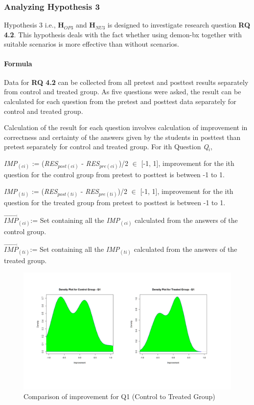 \subsubsection{Analyzing Hypothesis 3}\label{subsubsec:hypothesis3}
Hypothesis 3 i.e., \textbf{H$_{OP3}$} and \textbf{H$_{NU3}$} is designed to investigate research question \textbf{RQ 4.2}. This hypothesis deals with the fact whether using demon-bx together with suitable scenarios is more effective than without scenarios.

\paragraph{Formula}
Data for \textbf{RQ 4.2} can be collected from all pretest and posttest results separately from control and treated group. As five questions were asked, the result can be calculated for each question from the pretest and posttest data separately for control and treated group. 

Calculation of the result for each question involves calculation of improvement in correctness and certainty of the answers given by the students in posttest than pretest separately for control and treated group. For ith Question \textit{Q$_{i}$},

\textit{IMP$_{(ci)}$} := (\textit{RES$_{post(ci)}$} - \textit{RES$_{pre(ci)}$})/2 $\in$ [-1,  1], improvement for the ith question for the control group from pretest to posttest is between -1 to 1.

\textit{IMP$_{(ti)}$} := (\textit{RES$_{post(ti)}$} - \textit{RES$_{pre(ti)}$})/2 $\in$ [-1,  1], improvement for the ith question for the treated group from pretest to posttest is between -1 to 1.

$\overrightarrow{\textit{IMP}}$\textit{$_{(ci)}$}:= Set containing all the \textit{IMP$_{(ci)}$} calculated from the answers of the control group.

$\overrightarrow{\textit{IMP}}$\textit{$_{(ti)}$}:= Set containing all the \textit{IMP$_{(ti)}$} calculated from the answers of the treated group.

\begin{figure}
	\centering
	\includegraphics[width=1\textwidth]{figures/Control-Treated_q1}
	\caption{Comparison of improvement for Q1 (Control to Treated Group)}
	\label{fig:Control-Treated_q1}
\end{figure}

